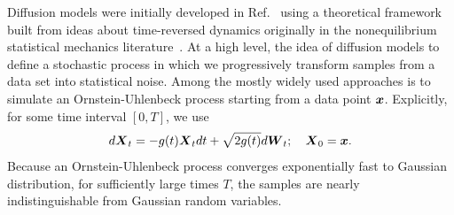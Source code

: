 \documentclass[11pt]{article}
\begin{document}
Diffusion models were initially developed in Ref.~\cite{sohl-dickstein_hamiltonian_2012} using a theoretical framework built from ideas about time-reversed dynamics originally in the nonequilibrium statistical mechanics literature~\cite{crooks_entropy_1999, kurchan_fluctuation_1998, lebowitz_gallavotticohen-type_1999}. 
At a high level, the idea of diffusion models to define a stochastic process in which we progressively transform samples from a data set into statistical noise.
Among the mostly widely used approaches is to simulate an Ornstein-Uhlenbeck process starting from a data point $\boldsymbol{x}$.
Explicitly, for some time interval $[0, T]$, we use
\begin{equation}
    d\boldsymbol{X}_t = - g(t) \boldsymbol{X}_t dt + \sqrt{2 g(t)} d\boldsymbol{W}_t; \quad \boldsymbol{X}_0 = \boldsymbol{x}.
    \label{eq:ou}
\end{equation}
Because an Ornstein-Uhlenbeck process converges exponentially fast to Gaussian distribution, for sufficiently large times $T$, the samples are nearly indistinguishable from Gaussian random variables. 
\end{document}

